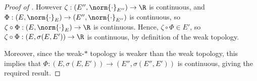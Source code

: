 \documentclass[twoside]{article}
\begin{document}
\begin{proof}[Proof of ]
    However $\zeta: (E'', \norm{\cdot}_{E''}) \to \R$ is continuous, and $\Phi: (E, \norm{\cdot}_E) \to (E'', \norm{\cdot}_{E''})$ is continuous, so $\zeta \circ \Phi: (E, \norm{\cdot}_E) \to \R$ is continuous.
    Hence, $\zeta \circ \Phi \in E'$, so $\zeta \circ \Phi: (E, \sigma(E, E')) \to \R$ is continuous, by definition of the weak topology.

    Moreover, since the weak-$*$ topology is weaker than the weak topology, this implies that $\Phi: (E, \sigma(E, E')) \to (E'', \sigma(E'', E'))$ is continuous, giving the required result.

\end{proof}
\end{document}
